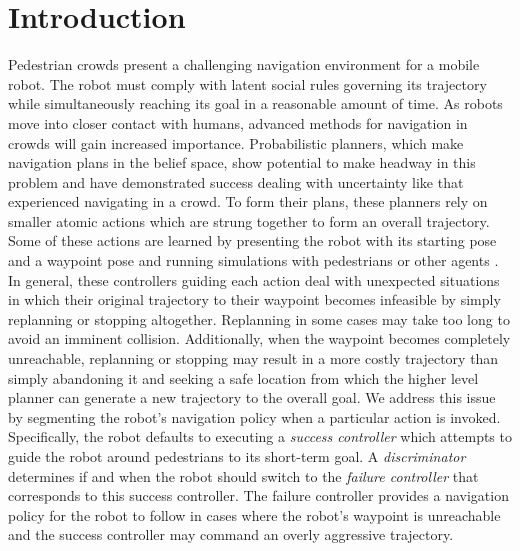 \documentclass[letterpaper]{article}
\begin{document}
	\section{Introduction}
		Pedestrian crowds present a challenging navigation environment for a mobile robot. The robot must comply with latent social rules governing its trajectory while simultaneously reaching its goal in a reasonable amount of time. As robots move into closer contact with humans, advanced methods for navigation in crowds will gain increased importance. Probabilistic planners, which make navigation plans in the belief space, show potential to make headway in this problem and have demonstrated success dealing with uncertainty like that experienced navigating in a crowd. To form their plans, these planners rely on smaller atomic actions which are strung together to form an overall trajectory. Some of these actions are learned by presenting the robot with its starting pose and a waypoint pose and running simulations with pedestrians or other agents \cite{crowdawarerl}. In general, these controllers guiding each action deal with unexpected situations in which their original trajectory to their waypoint becomes infeasible by simply replanning or stopping altogether. Replanning in some cases may take too long to avoid an imminent collision. Additionally, when the waypoint becomes completely unreachable, replanning or stopping may result in a more costly trajectory than simply abandoning it and seeking a safe location from which the higher level planner can generate a new trajectory to the overall goal. We address this issue by segmenting the robot's navigation policy when a particular action is invoked. Specifically, the robot defaults to executing a \textit{success controller} which attempts to guide the robot around pedestrians to its short-term goal. A \textit{discriminator} determines if and when the robot should switch to the \textit{failure controller} that corresponds to this success controller. The failure controller provides a navigation policy for the robot to follow in cases where the robot's waypoint is unreachable and the success controller may command an overly aggressive trajectory.
		
\end{document}
